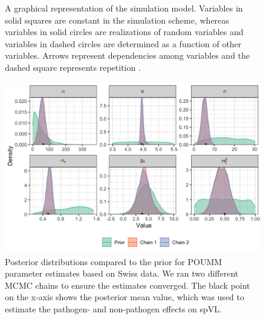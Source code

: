 \documentclass[]{article}
\begin{document}
\begin{doublespace}
\begin{figure}[H]
\begin{tikzpicture}
	\end{tikzpicture}
	\caption{A graphical representation of the simulation model. Variables in solid squares are constant in the simulation scheme, whereas variables in solid circles are realizations of random variables and variables in dashed circles are determined as a function of other variables. Arrows represent dependencies among variables and the dashed square represents repetition \parencite{Hohna2014}.}
	\label{fig:sim-design}
\end{figure}

\begin{figure}[H]
	\centering
		\includegraphics[width=\linewidth]{figures/poumm_parameter_estimates.png}
		\caption{Posterior distributions compared to the prior for POUMM parameter estimates based on Swiss data. We ran two different MCMC chains to ensure the estimates converged. The black point on the x-axis shows the posterior mean value, which was used to estimate the pathogen- and non-pathogen effects on spVL.}
\label{fig:poumm-parameters}
\end{figure}


\end{doublespace}
\end{document}
